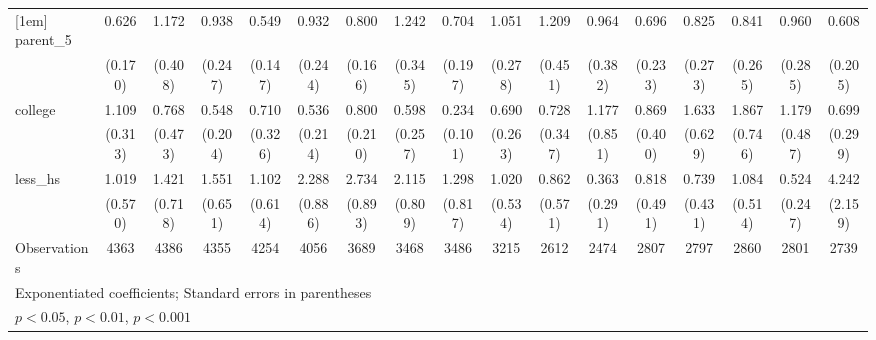 {\begin{tabular}{l*{16}{c}}
[1em]
parent\_5            &       0.626         &       1.172         &       0.938         &       0.549\sym{*}  &       0.932         &       0.800         &       1.242         &       0.704         &       1.051         &       1.209         &       0.964         &       0.696         &       0.825         &       0.841         &       0.960         &       0.608         \\
                    &     (0.170)         &     (0.408)         &     (0.247)         &     (0.147)         &     (0.244)         &     (0.166)         &     (0.345)         &     (0.197)         &     (0.278)         &     (0.451)         &     (0.382)         &     (0.233)         &     (0.273)         &     (0.265)         &     (0.285)         &     (0.205)         \\
[1em]
college             &       1.109         &       0.768         &       0.548         &       0.710         &       0.536         &       0.800         &       0.598         &       0.234\sym{***}&       0.690         &       0.728         &       1.177         &       0.869         &       1.633         &       1.867         &       1.179         &       0.699         \\
                    &     (0.313)         &     (0.473)         &     (0.204)         &     (0.326)         &     (0.214)         &     (0.210)         &     (0.257)         &     (0.101)         &     (0.263)         &     (0.347)         &     (0.851)         &     (0.400)         &     (0.629)         &     (0.746)         &     (0.487)         &     (0.299)         \\
[1em]
less\_hs             &       1.019         &       1.421         &       1.551         &       1.102         &       2.288\sym{*}  &       2.734\sym{**} &       2.115         &       1.298         &       1.020         &       0.862         &       0.363         &       0.818         &       0.739         &       1.084         &       0.524         &       4.242\sym{**} \\
                    &     (0.570)         &     (0.718)         &     (0.651)         &     (0.614)         &     (0.886)         &     (0.893)         &     (0.809)         &     (0.817)         &     (0.534)         &     (0.571)         &     (0.291)         &     (0.491)         &     (0.431)         &     (0.514)         &     (0.247)         &     (2.159)         \\
\hline
Observations        &        4363         &        4386         &        4355         &        4254         &        4056         &        3689         &        3468         &        3486         &        3215         &        2612         &        2474         &        2807         &        2797         &        2860         &        2801         &        2739         \\
\hline\hline
\multicolumn{17}{l}{\footnotesize Exponentiated coefficients; Standard errors in parentheses}\\
\multicolumn{17}{l}{\footnotesize \sym{*} \(p<0.05\), \sym{**} \(p<0.01\), \sym{***} \(p<0.001\)}\\
\end{tabular}
}
